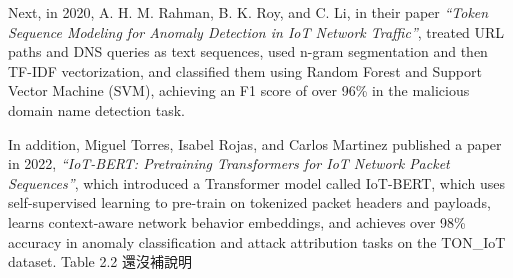 \begin{ZhChapter}
    \noindent Next, in 2020, A. H. M. Rahman, B. K. Roy, and C. Li, in their paper
    \emph{“Token Sequence Modeling for Anomaly Detection in IoT Network Traffic”}, treated URL paths and DNS queries as text sequences, used n-gram segmentation and then TF-IDF vectorization, and classified them using Random Forest and Support Vector Machine (SVM), achieving an F1 score of over 96\% in the malicious domain name detection task. \cite{rahman2020token}


    \noindent In addition, Miguel Torres, Isabel Rojas, and Carlos Martinez published a paper in 2022,
    \emph{“IoT-BERT: Pretraining Transformers for IoT Network Packet Sequences”}, which introduced a Transformer model called IoT-BERT, which uses self-supervised learning to pre-train on tokenized packet headers and payloads, learns context-aware network behavior embeddings, and achieves over 98\% accuracy in anomaly classification and attack attribution tasks on the TON\_IoT dataset. \cite{torres2022iotbert}
    Table 2.2 還沒補說明



\end{ZhChapter}
